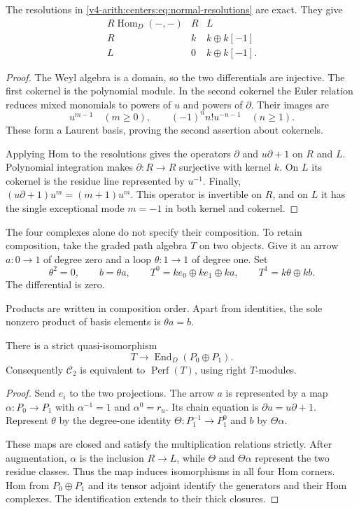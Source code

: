 \begin{lemma}\label{v4-arith:centers:lem:normal-corners}
The resolutions in
\eqref{v4-arith:centers:eq:normal-resolutions} are exact.
They give
\[
\begin{array}{c|cc}
 R\operatorname{Hom}_D(-,-)&R&L\\\hline
 R&k&k\oplus k[-1]\\
 L&0&k\oplus k[-1].
\end{array}
\]
\end{lemma}

\begin{proof}
The Weyl algebra is a domain, so the two differentials
are injective. The first cokernel is the polynomial module.
In the second cokernel the Euler relation reduces mixed
monomials to powers of $u$ and powers of $\partial$.
Their images are
\[
 u^{m-1}\quad(m\geq0),\qquad
 (-1)^n n!u^{-n-1}\quad(n\geq1).
\]
These form a Laurent basis, proving the second assertion
about cokernels.

Applying Hom to the resolutions gives the operators
$\partial$ and $u\partial+1$ on $R$ and $L$.
Polynomial integration makes $\partial:R\to R$
surjective with kernel $k$. On $L$ its cokernel is the
residue line represented by $u^{-1}$. Finally,
$(u\partial+1)u^m=(m+1)u^m$. This operator is invertible
on $R$, and on $L$ it has the single exceptional mode
$m=-1$ in both kernel and cokernel.
\end{proof}

The four complexes alone do not specify their composition.
To retain composition, take the graded path algebra $T$ on two
objects. Give it an arrow $a:0\to1$ of degree zero and a loop
$\theta:1\to1$ of degree one. Set
\[
 \theta^2=0,\qquad b=\theta a,\qquad
 T^0=ke_0\oplus ke_1\oplus ka,\qquad
 T^1=k\theta\oplus kb.
\]
The differential is zero.

Products are written in
composition order. Apart from identities, the sole
nonzero product of basis elements is $\theta a=b$.

\begin{proposition}\label{v4-arith:centers:prop:normal-model}
There is a strict quasi-isomorphism
\[
 T\longrightarrow\operatorname{End}_D(P_0\oplus P_1).
\]
Consequently $\mathcal C_2$ is equivalent to
$\operatorname{Perf}(T)$, using right $T$-modules.
\end{proposition}

\begin{proof}
Send $e_i$ to the two projections. The arrow $a$ is
represented by a map $\alpha:P_0\to P_1$ with
$\alpha^{-1}=1$ and $\alpha^0=r_u$. Its chain equation
is $\partial u=u\partial+1$. Represent $\theta$ by the
degree-one identity $\Theta:P_1^{-1}\to P_1^0$ and
$b$ by $\Theta\alpha$.

These maps are closed and satisfy the multiplication
relations strictly. After augmentation, $\alpha$ is the
inclusion $R\to L$, while $\Theta$ and $\Theta\alpha$
represent the two residue classes. Thus the map induces
isomorphisms in all four Hom corners. Hom from
$P_0\oplus P_1$ and its tensor adjoint identify the
generators and their Hom complexes. The identification
extends to their thick closures.
\end{proof}

